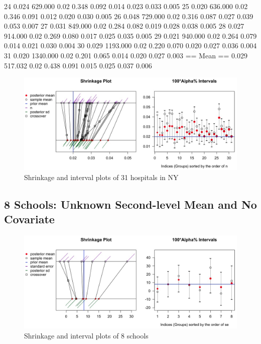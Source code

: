 \documentclass[article]{jss}
\begin{document}
\begin{CodeChunk}
\begin{CodeOutput}
24               0.024  629.000       0.02     0.348        0.092         0.014     0.023         0.033   0.005
25               0.020  636.000       0.02     0.346        0.091         0.012     0.020         0.030   0.005
26               0.048  729.000       0.02     0.316        0.087         0.027     0.039         0.053   0.007
27               0.031  849.000       0.02     0.284        0.082         0.019     0.028         0.038   0.005
28               0.027  914.000       0.02     0.269        0.080         0.017     0.025         0.035   0.005
29               0.021  940.000       0.02     0.264        0.079         0.014     0.021         0.030   0.004
30               0.029 1193.000       0.02     0.220        0.070         0.020     0.027         0.036   0.004
31               0.020 1340.000       0.02     0.201        0.065         0.014     0.020         0.027   0.003
== Mean ==       0.029  517.032       0.02     0.438        0.091         0.015     0.025         0.037   0.006
\end{CodeOutput}
\end{CodeChunk}
\begin{figure}[h]
\begin{center}
\includegraphics[scale=0.3]{hospital1.png}
\caption{Shrinkage and interval plots of 31 hospitals in NY}
\end{center}
\end{figure}

\subsection[Unknown Second-level Mean and No Covariate]{8 Schools: Unknown Second-level Mean and No Covariate}
\begin{figure}[h]
\begin{center}
\includegraphics[scale=0.3]{school1.png}
\caption{Shrinkage and interval plots of 8 schools}
\end{center}
\end{figure}
\end{document}
